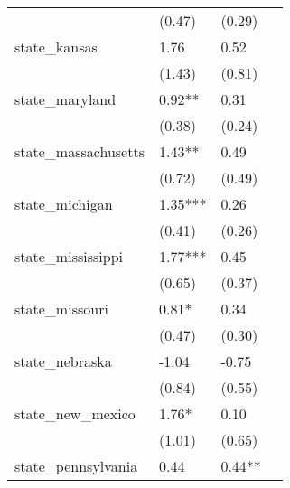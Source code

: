 \begin{table}
\begin{center}
\begin{tabular}{llll}
                                                   & (0.47)                 & (0.29)       &                \\
    state\_kansas                                  & 1.76                   & 0.52         &                \\
                                                   & (1.43)                 & (0.81)       &                \\
    state\_maryland                                & 0.92**                 & 0.31         &                \\
                                                   & (0.38)                 & (0.24)       &                \\
    state\_massachusetts                           & 1.43**                 & 0.49         &                \\
                                                   & (0.72)                 & (0.49)       &                \\
    state\_michigan                                & 1.35***                & 0.26         &                \\
                                                   & (0.41)                 & (0.26)       &                \\
    state\_mississippi                             & 1.77***                & 0.45         &                \\
                                                   & (0.65)                 & (0.37)       &                \\
    state\_missouri                                & 0.81*                  & 0.34         &                \\
                                                   & (0.47)                 & (0.30)       &                \\
    state\_nebraska                                & -1.04                  & -0.75        &                \\
                                                   & (0.84)                 & (0.55)       &                \\
    state\_new\_mexico                             & 1.76*                  & 0.10         &                \\
                                                   & (1.01)                 & (0.65)       &                \\
    state\_pennsylvania                            & 0.44                   & 0.44**       &                \\

\end{tabular}
\end{center}
\end{table}
